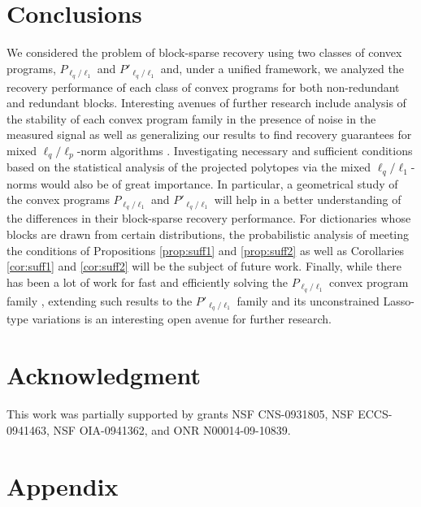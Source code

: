 \documentclass[10pt,twocolumn,twoside] {IEEEtran}
\begin{document}
{\section{Conclusions}
\label{sec:conc}
We considered the problem of block-sparse recovery using two classes of convex programs, $P_{\ell_q/\ell_1}$ and $P'_{\ell_q/\ell_1}$ and, under a unified framework, we analyzed the recovery performance of each class of convex programs for both non-redundant and redundant blocks. 
Interesting avenues of further research include analysis of the stability of each convex program family in the presence of noise in the measured signal as well as generalizing our results to find recovery guarantees for mixed $\ell_q/\ell_p$-norm algorithms \cite{Kowalski:ACHA09}. 
Investigating necessary and sufficient conditions based on the statistical analysis of the projected polytopes \cite{DonohoTanner:AMS09} via the mixed $\ell_q/\ell_1$-norms would also be of great importance. In particular, a geometrical study of the convex programs $P_{\ell_q/\ell_1}$ and $P'_{\ell_q/\ell_1}$ will help in a better understanding of the differences in their block-sparse recovery performance. For dictionaries whose blocks are drawn from certain distributions, the probabilistic analysis of meeting the conditions of Propositions \ref{prop:suff1} and \ref{prop:suff2} as well as Corollaries \ref{cor:suff1} and \ref{cor:suff2} will be the subject of future work. Finally, while there has been a lot of work for fast and efficiently solving the $P_{\ell_q/\ell_1}$ convex program family \cite{Wright:TSP09, Ewout:SJO11}, extending such results to the $P'_{\ell_q/\ell_1}$ family and its unconstrained Lasso-type variations is an interesting open avenue for further research. 

\section*{Acknowledgment}
\vspace{0mm}
{This work was partially supported by grants NSF CNS-0931805, NSF ECCS-0941463, NSF OIA-0941362, and ONR N00014-09-10839.}

\section*{Appendix}
\label{sec:appendix}

}
\end{document}
